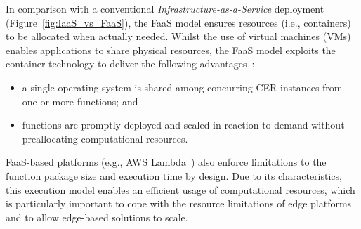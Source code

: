 In comparison with a conventional \textit{Infrastructure-as-a-Service} deployment (Figure~\ref{fig:IaaS_vs_FaaS}), %
the FaaS model ensures resources (i.e., containers) to be allocated when actually needed. Whilst the use of virtual machines (VMs) enables applications to share physical resources, the FaaS model exploits the container technology to deliver the following advantages~\cite{GarrigaMendonca2017}:

\begin{itemize}
    \item a single operating system is shared among concurring CER instances from one or more functions; and
    \item functions are promptly deployed and scaled in reaction to demand without preallocating computational resources.
\end{itemize}

FaaS-based platforms (e.g., AWS Lambda~\cite{AWSLambda}) also enforce limitations to the function package size and execution time by design. Due to its characteristics, this execution model enables an efficient usage of computational resources, which is particularly important to cope with the resource limitations of edge platforms and to allow edge-based solutions to scale. 




%




